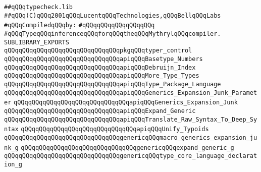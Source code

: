 \label{src/lib/compiler/front/typer/typer.sublib}
\verb|##qQQqtypecheck.lib|\newline
\verb|##qQQq(C)qQQq2001qQQqLucentqQQqTechnologies,qQQqBellqQQqLabs|\newline
\newline
\verb|#qQQqCompiledqQQqby:|\newline
\verb|#qQQqqQQqqQQqqQQqqQQq|\newline
\newline
\newline
\newline
\verb|#qQQqTypeqQQqinferenceqQQqforqQQqtheqQQqMythrylqQQqcompiler.|\newline
\newline
\newline
\newline
\verb|SUBLIBRARY_EXPORTS|\newline
\newline
\verb|qQQqqQQqqQQqqQQqqQQqqQQqqQQqqQQqpkgqQQqtyper_control|\newline
\newline
\verb|qQQqqQQqqQQqqQQqqQQqqQQqqQQqqQQqapiqQQqBasetype_Numbers|\newline
\verb|qQQqqQQqqQQqqQQqqQQqqQQqqQQqqQQqapiqQQqDebruijn_Index|\newline
\verb|qQQqqQQqqQQqqQQqqQQqqQQqqQQqqQQqapiqQQqMore_Type_Types|\newline
\verb|qQQqqQQqqQQqqQQqqQQqqQQqqQQqqQQqapiqQQqType_Package_Language|\newline
\verb|qQQqqQQqqQQqqQQqqQQqqQQqqQQqqQQqapiqQQqGenerics_Expansion_Junk_Parameter|\newline
\verb|qQQqqQQqqQQqqQQqqQQqqQQqqQQqqQQqapiqQQqGenerics_Expansion_Junk|\newline
\verb|qQQqqQQqqQQqqQQqqQQqqQQqqQQqqQQqapiqQQqExpand_Generic|\newline
\verb|qQQqqQQqqQQqqQQqqQQqqQQqqQQqqQQqapiqQQqTranslate_Raw_Syntax_To_Deep_Syntax|\newline
\verb|qQQqqQQqqQQqqQQqqQQqqQQqqQQqqQQqapiqQQqUnify_Typoids|\newline
\newline
\verb|qQQqqQQqqQQqqQQqqQQqqQQqqQQqqQQqgenericqQQqmacro_generics_expansion_junk_g|\newline
\verb|qQQqqQQqqQQqqQQqqQQqqQQqqQQqqQQqgenericqQQqexpand_generic_g|\newline
\verb|qQQqqQQqqQQqqQQqqQQqqQQqqQQqqQQqgenericqQQqtype_core_language_declaration_g|\newline
